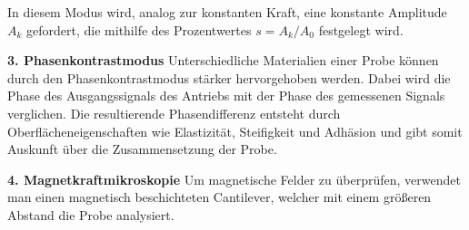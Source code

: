 In diesem Modus wird, analog zur konstanten Kraft, eine konstante Amplitude $A_k$ gefordert,
die mithilfe des Prozentwertes $s = A_k / A_0$ festgelegt wird.


\textbf{3. Phasenkontrastmodus}
Unterschiedliche Materialien einer Probe können durch den Phasenkontrastmodus stärker hervorgehoben werden.
Dabei wird die Phase des Ausgangssignals des Antriebs mit der Phase des gemessenen Signals verglichen.
Die resultierende Phasendifferenz entsteht durch Oberflächeneigenschaften wie Elastizität, Steifigkeit und Adhäsion und gibt somit Auskunft über die Zusammensetzung der Probe.


\textbf{4. Magnetkraftmikroskopie}
Um magnetische Felder zu überprüfen, verwendet man einen magnetisch beschichteten Cantilever, welcher mit einem größeren Abstand die Probe analysiert.


